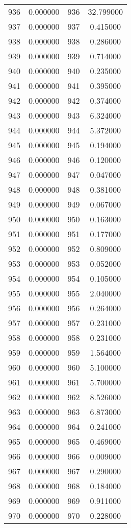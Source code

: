 \documentclass[12pt]{article}
\begin{document}
\begin{longtable}{@{}cccc@{}}
936 & 0.000000 & 936 & 32.799000 \\
937 & 0.000000 & 937 & 0.415000 \\
938 & 0.000000 & 938 & 0.286000 \\
939 & 0.000000 & 939 & 0.714000 \\
940 & 0.000000 & 940 & 0.235000 \\
941 & 0.000000 & 941 & 0.395000 \\
942 & 0.000000 & 942 & 0.374000 \\
943 & 0.000000 & 943 & 6.324000 \\
944 & 0.000000 & 944 & 5.372000 \\
945 & 0.000000 & 945 & 0.194000 \\
946 & 0.000000 & 946 & 0.120000 \\
947 & 0.000000 & 947 & 0.047000 \\
948 & 0.000000 & 948 & 0.381000 \\
949 & 0.000000 & 949 & 0.067000 \\
950 & 0.000000 & 950 & 0.163000 \\
951 & 0.000000 & 951 & 0.177000 \\
952 & 0.000000 & 952 & 0.809000 \\
953 & 0.000000 & 953 & 0.052000 \\
954 & 0.000000 & 954 & 0.105000 \\
955 & 0.000000 & 955 & 2.040000 \\
956 & 0.000000 & 956 & 0.264000 \\
957 & 0.000000 & 957 & 0.231000 \\
958 & 0.000000 & 958 & 0.231000 \\
959 & 0.000000 & 959 & 1.564000 \\
960 & 0.000000 & 960 & 5.100000 \\
961 & 0.000000 & 961 & 5.700000 \\
962 & 0.000000 & 962 & 8.526000 \\
963 & 0.000000 & 963 & 6.873000 \\
964 & 0.000000 & 964 & 0.241000 \\
965 & 0.000000 & 965 & 0.469000 \\
966 & 0.000000 & 966 & 0.009000 \\
967 & 0.000000 & 967 & 0.290000 \\
968 & 0.000000 & 968 & 0.184000 \\
969 & 0.000000 & 969 & 0.911000 \\
970 & 0.000000 & 970 & 0.228000 \\

\end{longtable}
\end{document}
